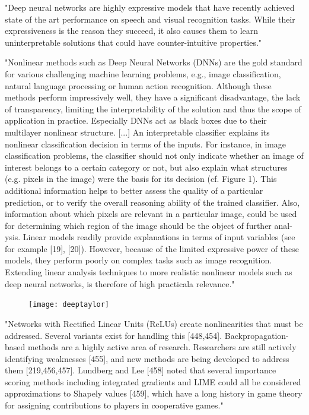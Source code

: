 "Deep neural networks are highly expressive models that have recently achieved state of the art performance on speech and visual recognition tasks. While their expressiveness is the reason they succeed, it also causes them to learn uninterpretable solutions that could have counter-intuitive properties." \cite{Szegedy2013}

"Nonlinear methods such as Deep Neural Networks (DNNs) are the gold standard for various challenging machine learning problems, e.g., image classification, natural language processing or human action recognition. Although these methods perform impressively well, they have a significant disadvantage, the lack of transparency, limiting the interpretability of the solution and thus the scope of application in practice. Especially DNNs act as black boxes due to their multilayer nonlinear structure.
[...]
An interpretable classifier explains its nonlinear classification decision in terms of the inputs. For instance, in image classification problems, the classifier should not only indicate whether an image of interest belongs to a certain category or not, but also explain what structures (e.g. pixels in the image) were the basis for its decision (cf. Figure 1). This additional information helps to better assess the quality of a particular prediction, or to verify the overall reasoning ability of the trained classifier. Also, information about which pixels are relevant in a particular image, could be used for determining which region of the image should be the object of further anal- ysis. Linear models readily provide explanations in terms of input variables (see for example [19], [20]). However, because of the limited expressive power of these models, they perform poorly on complex tasks such as image recognition. Extending linear analysis techniques to more realistic nonlinear models such as deep neural networks, is therefore of high practicala relevance." \cite{Montavon2017}
\begin{figure}
	\centering
	\texttt{[image: deeptaylor]}\\
\end{figure}

"Networks with Rectified Linear Units (ReLUs) create nonlinearities that must be addressed. Several variants exist for handling this [448,454]. Backpropagation-based methods are a highly active area of research. Researchers are still actively identifying weaknesses [455], and new methods are being developed to address them [219,456,457]. Lundberg and Lee [458] noted that several importance scoring methods including integrated gradients and LIME could all be considered approximations to Shapely values [459], which have a long history in game theory for assigning contributions to players in cooperative games." \cite{Ching2017}

